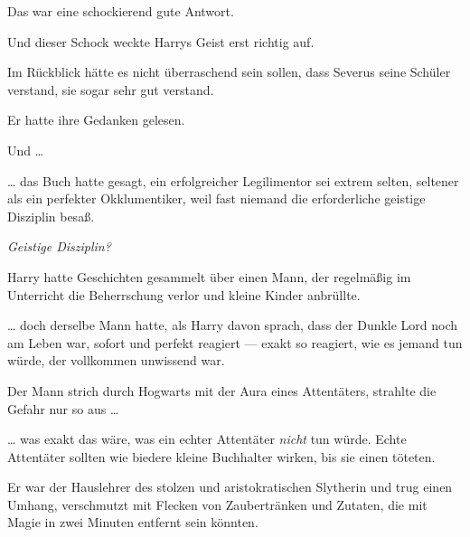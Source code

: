 Das war eine schockierend gute Antwort.

Und dieser Schock weckte Harrys Geist erst richtig auf.

Im Rückblick hätte es nicht überraschend sein sollen, dass Severus seine Schüler verstand, sie sogar sehr gut verstand.

Er hatte ihre Gedanken gelesen.

Und …

… das Buch hatte gesagt, ein erfolgreicher Legilimentor sei extrem selten, seltener als ein perfekter Okklumentiker, weil fast niemand die erforderliche geistige Disziplin besaß.

\emph{Geistige Disziplin?}

Harry hatte Geschichten gesammelt über einen Mann, der regelmäßig im Unterricht die Beherrschung verlor und kleine Kinder anbrüllte.

… doch derselbe Mann hatte, als Harry davon sprach, dass der Dunkle Lord noch am Leben war, sofort und perfekt reagiert — exakt so reagiert, wie es jemand tun würde, der vollkommen unwissend war.

Der Mann strich durch Hogwarts mit der Aura eines Attentäters, strahlte die Gefahr nur so aus …

… was exakt das wäre, was ein echter Attentäter \emph{nicht} tun würde. Echte Attentäter sollten wie biedere kleine Buchhalter wirken, bis sie einen töteten.

Er war der Hauslehrer des stolzen und aristokratischen Slytherin und trug einen Umhang, verschmutzt mit Flecken von Zaubertränken und Zutaten, die mit Magie in zwei Minuten entfernt sein könnten.


